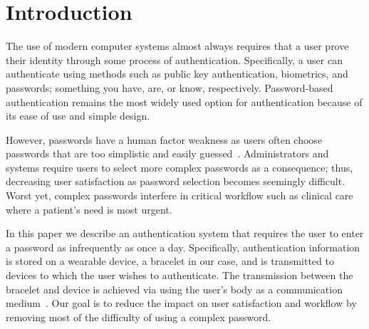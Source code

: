 \section{Introduction}\label{sec:intro}
The use of modern computer systems almost always requires that a user prove their identity through some process of authentication.  Specifically, a user can authenticate using methods such as public key authentication, biometrics, and passwords; something you have, are, or know, respectively.  Password-based authentication remains the most widely used option for authentication because of its ease of use and simple design. %


However, passwords have a human factor weakness as users often choose passwords that are too simplistic and easily guessed~\cite{Yan:2004:PMS:1024867.1025014}.  Administrators and systems require users to select more complex passwords as a consequence; thus, decreasing user satisfaction as password selection becomes seemingly difficult. Worst yet, complex passwords interfere in critical workflow such as clinical care where a patient's need is most urgent.  

In this paper we describe an authentication system that requires the user to enter a password as infrequently as once a day.  Specifically, authentication information is stored on a wearable device, a bracelet in our case, and is transmitted to devices to which the user wishes to authenticate. The transmission between the bracelet and device is achieved via using the user's body as a communication medium~\cite{Barth:2008:BCB:1460257.1460273,chang:healthtech:2013}. Our goal is to reduce the impact on user satisfaction and workflow by removing most of the difficulty of using a complex password. 

